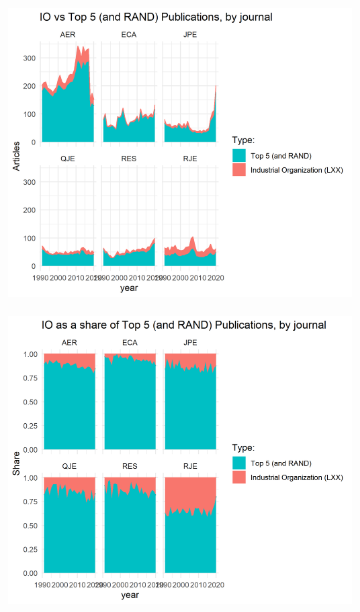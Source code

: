 \documentclass[11pt, letterpaper, twoside]{article}
\begin{document}
\begin{figure}
    \begin{subfigure}[!htbp]{0.49\textwidth}
        \centering
        \includegraphics[width=\textwidth]{LXX-code-share-area-by-journal.png}
    \end{subfigure}
    \hfill
    \begin{subfigure}[!htbp]{0.49\textwidth}
        \centering
        \includegraphics[width=\textwidth]{LXX-code-share-area-normalized-by-journal.png}
    \end{subfigure}
\end{figure}
\end{document}
